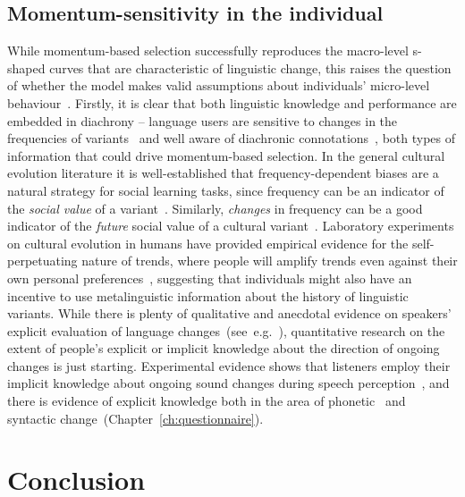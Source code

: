 \subsection{Momentum-sensitivity in the individual}

While momentum-based selection successfully reproduces the macro-level s-shaped curves that are characteristic of linguistic change, this raises the question of whether the model makes valid assumptions about individuals' micro-level behaviour~\citep{Mesoudi2009}. Firstly, it is clear that both linguistic knowledge and performance are embedded in diachrony -- language users are sensitive to changes in the frequencies of variants~\citep{Jaeger2013} and well aware of diachronic connotations~\citep{Labov2001,Guy2003,Tagliamonte2012}, %
both types of information that could drive momentum-based selection. In the general cultural evolution literature it is well-established that frequency-dependent biases are a natural strategy for social learning tasks, since frequency can be an indicator of the \emph{social value} of a variant~\citep{Boyd1985}. Similarly, \emph{changes} in frequency can be a good indicator of the \emph{future} social value of a cultural variant~\citep{Gureckis2009}. Laboratory experiments on cultural evolution in humans have provided empirical evidence for the self-perpetuating nature of trends, where people will amplify trends even against their own personal preferences~\citep{Salganik2008,Willer2009}, suggesting that individuals might also have an incentive to use metalinguistic information about the history of linguistic variants. While there is plenty of qualitative and anecdotal evidence on speakers' explicit evaluation of language changes~(see~e.g.~\citealt{Trudgill1972,Labov2001,Guy2003,Tagliamonte2012}), quantitative research on the extent of people's explicit or implicit knowledge about the direction of ongoing changes is just starting. Experimental evidence shows that listeners employ their implicit knowledge about ongoing sound changes during speech perception~\citep{Hay2006,Drager2011}, and there is evidence of explicit knowledge both in the area of phonetic~\citep{Carrera-Sabate2014} and syntactic change~(Chapter~\ref{ch:questionnaire}). %


\section{Conclusion}

